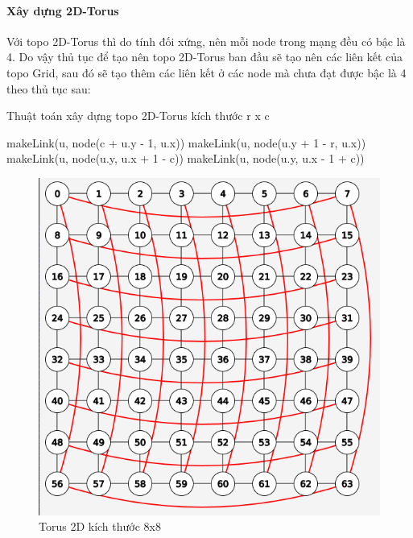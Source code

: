 \documentclass[../report.tex]{subfiles}
\begin{document}
\paragraph*{Xây dựng 2D-Torus}
Với topo 2D-Torus thì do tính đối xứng, nên mỗi node trong mạng đều có bậc là 4.
Do vậy thủ tục để tạo nên topo 2D-Torus ban đầu sẽ tạo nên các liên kết của topo Grid, sau đó sẽ tạo thêm các liên kết ở các node mà chưa đạt được bậc là 4 theo thủ tục sau:
\begin{algorithm}[H]
		\caption{Thuật toán xây dựng topo 2D-Torus kích thước r x c}
		\begin{algorithmic}[1]
            \State makeLink(u, node(c + u.y - 1, u.x))
            \EndIf
            \State makeLink(u, node(u.y + 1 - r, u.x))
            \EndIf
            \State makeLink(u, node(u.y, u.x + 1 - c))
            \EndIf
            \State makeLink(u, node(u.y, u.x - 1 + c))
            \EndIf
			\EndFor
			\EndProcedure
		\end{algorithmic}
\end{algorithm}
\begin{figure}[H]
    \centering
    \includegraphics[scale=0.5]{figures/torus.png}
    \caption {Torus 2D kích thước 8x8}
\end{figure}
\end{document}
